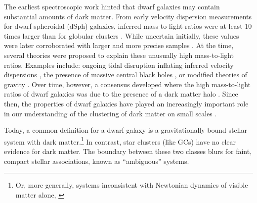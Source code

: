 The earliest spectroscopic work hinted that dwarf galaxies may contain
substantial amounts of dark matter. From early velocity dispersion
measurements for dwarf spheroidal (dSph) galaxies, inferred
mass-to-light ratios were at least 10 times larger than for globular
clusters \citep[GCs, e.g.,][]{aaronson1983, aaronson+olszewski1987}.
While uncertain initially, these values were later corroborated with
larger and more precise samples \citep[e.g.,][]{hargreaves+1994}. At the
time, several theories were proposed to explain these unusually high
mass-to-light ratios. Examples include: ongoing tidal disruption
inflating inferred velocity dispersions
\citep[e.g.,][]{kuhn+miller1989}, the presence of massive central black
holes \citep[e.g.,][]{strobel+lake1994}, or modified theories of gravity
\citep{milgrom1995}. Over time, however, a consensus developed where the
high mass-to-light ratios of dwarf galaxies was due to the presence of a
dark matter halo \citep[e.g.,][]{dekel+silk1986, wechsler+tinker2018}.
Since then, the properties of dwarf galaxies have played an increasingly
important role in our understanding of the clustering of dark matter on
small scales \citep[e.g.,][]{sales+2022, bullock+boylan-kolchin2017}.

Today, a common definition for a dwarf galaxy is a gravitationally bound
stellar system with dark matter.\footnote{Or, more generally, systems
  inconsistent with Newtonian dynamics of visible matter alone,
  \citet{willman+strader2012}} In contrast, star clusters (like GCs)
have no clear evidence for dark matter. The boundary between these two
classes blurs for faint, compact stellar associations, known as
``ambiguous'' systems.

